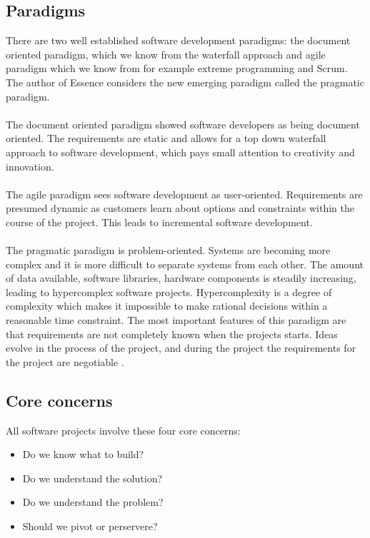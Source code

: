 \subsection{Paradigms}
There are two well established software development paradigms: the document oriented paradigm, which we know from the waterfall approach and agile paradigm which we know from for example extreme programming and Scrum.
The author of Essence considers the new emerging paradigm called the pragmatic paradigm.
\\\\
The document oriented paradigm showed software developers as being document oriented. 
The requirements are static and allows for a top down waterfall approach to software development, which pays small attention to creativity and innovation.
\\\\
The agile paradigm sees software development as user-oriented.
Requirements are presumed dynamic as customers learn about options and constraints within the course of the project.
This leads to incremental software development.
\\\\
The pragmatic paradigm is problem-oriented. 
Systems are becoming more complex and it is more difficult to separate systems from each other. 
The amount of data available, software libraries, hardware components is steadily increasing, leading to hypercomplex software projects.
Hypercomplexity is a degree of complexity which makes it impossible to make rational decisions within a reasonable time constraint.
The most important features of this paradigm are that requirements are not completely known when the projects starts.
Ideas evolve in the process of the project, and during the project the requirements for the project are negotiable \autocite{Essence}. 

\subsection{Core concerns}
All software projects involve these four core concerns:

\begin{itemize}
    \item Do we know what to build?
    \item Do we understand the solution?
    \item Do we understand the problem?
    \item Should we pivot or perservere?
\end{itemize}

